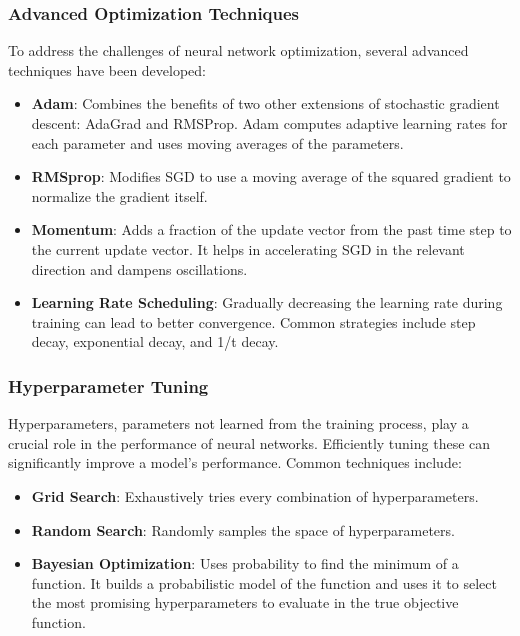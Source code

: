 \subsubsection{Advanced Optimization Techniques}

To address the challenges of neural network optimization, several advanced techniques have been developed:

\begin{itemize}
    \item \textbf{Adam}: Combines the benefits of two other extensions of stochastic gradient descent: AdaGrad and RMSProp. Adam computes adaptive learning rates for each parameter and uses moving averages of the parameters.
    \item \textbf{RMSprop}: Modifies SGD to use a moving average of the squared gradient to normalize the gradient itself.
    \item \textbf{Momentum}: Adds a fraction of the update vector from the past time step to the current update vector. It helps in accelerating SGD in the relevant direction and dampens oscillations.
    \item \textbf{Learning Rate Scheduling}: Gradually decreasing the learning rate during training can lead to better convergence. Common strategies include step decay, exponential decay, and 1/t decay.
\end{itemize}

\subsubsection{Hyperparameter Tuning}

Hyperparameters, parameters not learned from the training process, play a crucial role in the performance of neural networks. Efficiently tuning these can significantly improve a model's performance. Common techniques include:

\begin{itemize}
    \item \textbf{Grid Search}: Exhaustively tries every combination of hyperparameters.
    \item \textbf{Random Search}: Randomly samples the space of hyperparameters.
    \item \textbf{Bayesian Optimization}: Uses probability to find the minimum of a function. It builds a probabilistic model of the function and uses it to select the most promising hyperparameters to evaluate in the true objective function.
\end{itemize}

